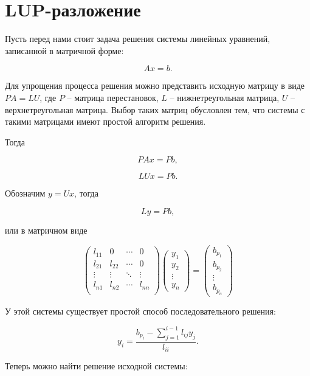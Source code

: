 \section{LUP-разложение}

Пусть перед нами стоит задача решения системы линейных уравнений, записанной в
матричной форме:

\[
    Ax = b.
\]

Для упрощения процесса решения можно представить исходную матрицу в виде
\( PA = LU \), где \( P \) -- матрица перестановок, \( L \) -- нижнетреугольная
матрица, \( U \) -- верхнетреугольная матрица. Выбор таких матриц обусловлен
 тем, что системы с такими матрицами имеют простой алгоритм решения.

Тогда

\[
    PAx = Pb,
\]

\[
    LUx = Pb.
\]

Обозначим \( y = Ux \), тогда

\[
    Ly = Pb,
\]

или в матричном виде

\[
    \begin{pmatrix}
        l_{11} & 0 & \cdots & 0 \\
        l_{21} & l_{22} & \cdots & 0 \\
        \vdots & \vdots & \ddots & \vdots \\
        l_{n1} & l_{n2} & \cdots & l_{nn} \\
    \end{pmatrix}
    \begin{pmatrix}
        y_1 \\ y_2 \\ \vdots \\ y_n
    \end{pmatrix}
    =
    \begin{pmatrix}
        b_{p_1} \\ b_{p_2} \\ \vdots \\ b_{p_n}
    \end{pmatrix}
\]

У этой системы существует простой способ последовательного решения:

\[
    y_i = \frac{b_{p_i} - \sum\limits_{j=1}^{i-1} l_{ij}y_j}{l_{ii}}.
\]

Теперь можно найти решение исходной системы:

